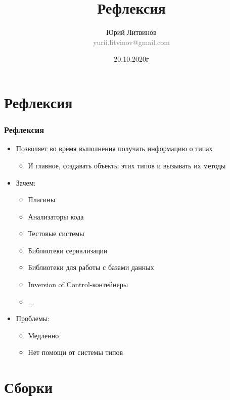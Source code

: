 \documentclass[xetex,mathserif,serif]{beamer}
\title{Рефлексия}
\author[Юрий Литвинов]{Юрий Литвинов\\\small{\textcolor{gray}{yurii.litvinov@gmail.com}}}
\date{20.10.2020г}
\begin{document}
    \frame{\titlepage}

    \section{Рефлексия}

    \begin{frame}
        \frametitle{Рефлексия}
        \begin{itemize}
            \item Позволяет во время выполнения получать информацию о типах
            \begin{itemize}
                \item И главное, создавать объекты этих типов и вызывать их методы
            \end{itemize}
            \item Зачем:
            \begin{itemize}
                \item Плагины
                \item Анализаторы кода
                \item Тестовые системы
                \item Библиотеки сериализации
                \item Библиотеки для работы с базами данных
                \item Inversion of Control-контейнеры
                \item ...
            \end{itemize}
            \item Проблемы:
            \begin{itemize}
                \item Медленно
                \item Нет помощи от системы типов
            \end{itemize}
        \end{itemize}
    \end{frame}

    \section{Сборки}
\end{document}
